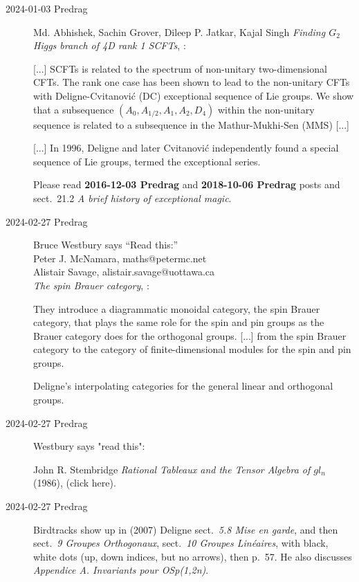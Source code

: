 \begin{description}
\item[2024-01-03 Predrag]
Md. Abhishek, Sachin Grover, Dileep P. Jatkar, Kajal Singh %
{\em Finding $G_2$ Higgs branch of 4D rank 1 SCFTs},
:

[...] SCFTs is related to the spectrum of non-unitary two-dimensional
CFTs. The rank one case has been shown to lead to the non-unitary CFTs
with Deligne-Cvitanovi{\'c} (DC) exceptional sequence of Lie groups. We show
that a subsequence $(A_0,A_{1/2},A_1,A_2,D_4)$ within the non-unitary sequence is
related to a subsequence in the Mathur-Mukhi-Sen (MMS) [...]

[...]
In 1996, Deligne and later Cvitanovi{\'c} independently found a special sequence
of Lie groups, termed the exceptional series.

Please read {\bf 2016-12-03 Predrag} and {\bf 2018-10-06 Predrag}
posts and
{sect.~21.2} {\em A brief history of exceptional magic}.

\item[2024-02-27 Predrag]
{Bruce Westbury} says ``Read this:''
\\
 {Peter J. McNamara}, maths@petermc.net
\\
 {Alistair Savage}, alistair.savage@uottawa.ca
\\
{\em The spin Brauer category},
:

They introduce a diagrammatic monoidal category,
the spin Brauer category, that plays the same role for the spin
and pin groups as the Brauer category does for the orthogonal groups.
[...]
from the spin Brauer category to the category of
finite-dimensional modules for the spin and pin groups.

Deligne’s interpolating categories for the
general linear and orthogonal groups.


\item[2024-02-27 Predrag] Westbury says "read this":

John R. Stembridge
{\em Rational Tableaux and the Tensor Algebra of $gl_n$} (1986),
 {(click here)}.

\item[2024-02-27 Predrag] Birdtracks show up in (2007)
Deligne sect.~{\em 5.8 Mise en garde}, and
then sect.~{\em 9 Groupes Orthogonaux},
sect.~{\em 10 Groupes Lin\'eaires}, with black, white dots (up, down indices,
but no arrows), then p.~57. He also discusses
{\em Appendice A. Invariants pour OSp(1,2n)}.


\end{description}
